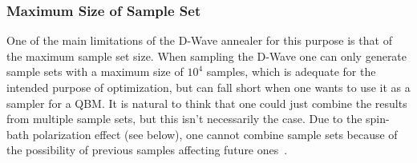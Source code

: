 \subsubsection{Maximum Size of Sample Set}
One of the main limitations of the D-Wave annealer for this purpose is that of the maximum sample set size.
When sampling the D-Wave one can only generate sample sets with a maximum size of \( 10^4 \) samples, which is adequate for the intended purpose of optimization, but can fall short when one wants to use it as a sampler for a QBM.
It is natural to think that one could just combine the results from multiple sample sets, but this isn't necessarily the case.
Due to the spin-bath polarization effect (see below), one cannot combine sample sets because of the possibility of previous samples affecting future ones~\cite{pochart_2021}.

